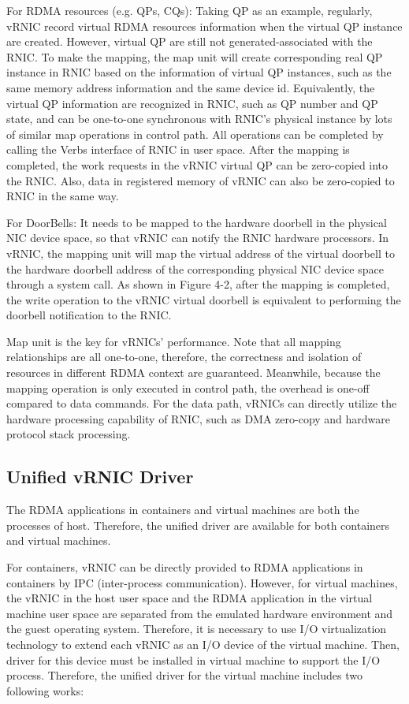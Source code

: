 For RDMA resources (e.g. QPs, CQs): Taking QP as an example, regularly, vRNIC record virtual RDMA resources information when the virtual QP instance are created. However, virtual QP are still not generated-associated with the RNIC. To make the mapping, the map unit will create corresponding real QP instance in RNIC based on the information of virtual QP instances, such as the same memory address information and the same device id. Equivalently, the virtual QP information are recognized in RNIC, such as QP number and QP state, and can be one-to-one synchronous with RNIC’s physical instance by lots of similar map operations in control path. All operations can be completed by calling the Verbs interface of RNIC in user space. After the mapping is completed, the work requests in the vRNIC virtual QP can be zero-copied into the RNIC. Also, data in registered memory of vRNIC can also be zero-copied to RNIC in the same way. 

For DoorBells: It needs to be mapped to the hardware doorbell in the physical NIC device space, so that vRNIC can notify the RNIC hardware processors. In vRNIC, the mapping unit will map the virtual address of the virtual doorbell to the hardware doorbell address of the corresponding physical NIC device space through a system call. As shown in Figure 4-2, after the mapping is completed, the write operation to the vRNIC virtual doorbell is equivalent to performing the doorbell notification to the RNIC.

Map unit is the key for vRNICs' performance. Note that all mapping relationships are all one-to-one, therefore, the correctness and isolation of resources in different RDMA context are guaranteed. Meanwhile, because the mapping operation is only executed in control path, the overhead is one-off compared to data commands. For the data path, vRNICs can directly utilize the hardware processing capability of RNIC, such as DMA zero-copy and hardware protocol stack processing.

\subsection{Unified vRNIC Driver}
The RDMA applications in containers and virtual machines are both the processes of host. Therefore, the unified driver are available for both containers and virtual machines. 

For containers, vRNIC can be directly provided to RDMA applications in containers by IPC (inter-process communication). However, for virtual machines, the vRNIC in the host user space and the RDMA application in the virtual machine user space are separated from the emulated hardware environment and the guest operating system. Therefore, it is necessary to use I/O virtualization technology to extend each vRNIC as an I/O device of the virtual machine. Then, driver for this device must be installed in virtual machine to support the I/O process. Therefore, the unified driver for the virtual machine includes two following works:


